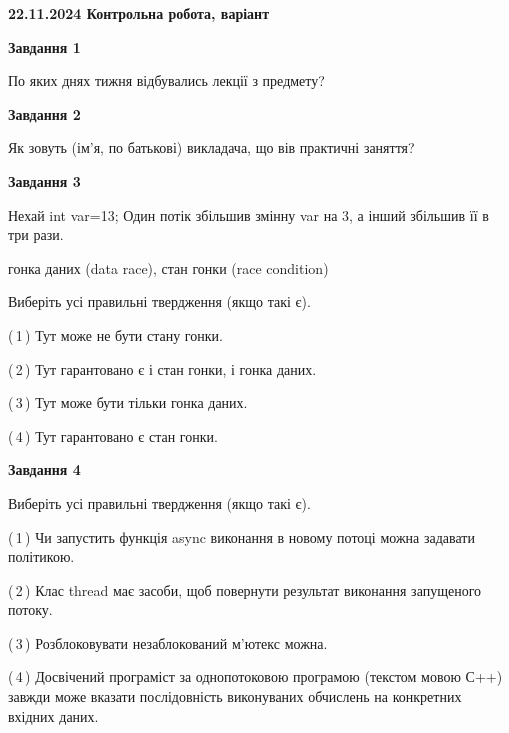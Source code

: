 \documentclass[12pt, ukrainian]{article}
\begin{document}
\begin {large}

\textbf{22.11.2024 Контрольна робота, варіант  }\par


{

\begin{center}
\textbf{Завдання 1}
\end{center}

По яких днях тижня відбувались лекції з предмету?


\begin{center}
\textbf{Завдання 2}
\end{center}

Як зовуть (ім'я, по батькові) викладача, що вів практичні заняття?


\begin{center}
\textbf{Завдання 3}
\end{center}

Нехай int var=13; Один потік збільшив змінну var на 3, а інший збільшив її в три рази.

гонка даних (data race), стан гонки (race condition)

Виберіть усі правильні твердження (якщо такі є).\par
\vspace{2mm}
(\,1\,) Тут може не бути стану гонки.%

(\,2\,) Тут гарантовано є і стан гонки, і гонка даних.%

(\,3\,) Тут може бути тільки гонка даних.%

(\,4\,) Тут гарантовано є стан гонки.%


\begin{center}
\textbf{Завдання 4}
\end{center}

Виберіть усі правильні твердження (якщо такі є).\par
\vspace{2mm}

(\,1\,) Чи запустить функція  async виконання в новому потоці можна задавати політикою.%

(\,2\,) Клас thread має засоби, щоб повернути результат виконання запущеного потоку.%

(\,3\,) Розблоковувати незаблокований м’ютекс можна.%

(\,4\,) Досвічений програміст за однопотоковою програмою (текстом мовою С++) завжди може вказати послідовність виконуваних обчислень на конкретних вхідних даних.%


}
\end{large}
\end{document}
